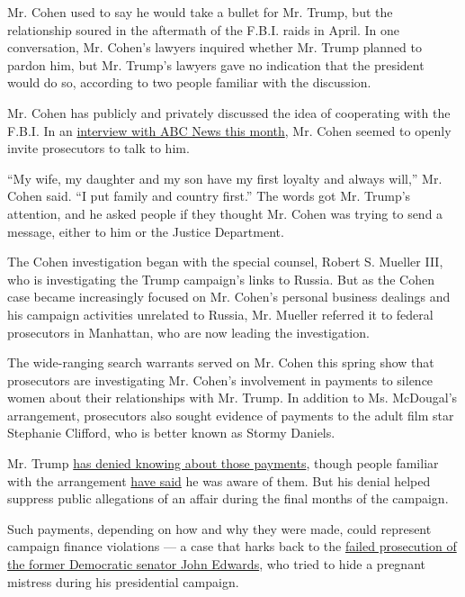 Mr. Cohen used to say he would take a bullet for Mr. Trump, but the
relationship soured in the aftermath of the F.B.I. raids in April. In
one conversation, Mr. Cohen's lawyers inquired whether Mr. Trump planned
to pardon him, but Mr. Trump's lawyers gave no indication that the
president would do so, according to two people familiar with the
discussion.

Mr. Cohen has publicly and privately discussed the idea of cooperating
with the F.B.I. In an
\href{https://abcnews.go.com/Politics/michael-cohen-family-country-president-trump-loyalty/story?id=56304585}{interview
with ABC News this month}, Mr. Cohen seemed to openly invite prosecutors
to talk to him.

``My wife, my daughter and my son have my first loyalty and always
will,'' Mr. Cohen said. ``I put family and country first.'' The words
got Mr. Trump's attention, and he asked people if they thought Mr. Cohen
was trying to send a message, either to him or the Justice Department.

The Cohen investigation began with the special counsel, Robert S.
Mueller III, who is investigating the Trump campaign's links to Russia.
But as the Cohen case became increasingly focused on Mr. Cohen's
personal business dealings and his campaign activities unrelated to
Russia, Mr. Mueller referred it to federal prosecutors in Manhattan, who
are now leading the investigation.

The wide-ranging search warrants served on Mr. Cohen this spring show
that prosecutors are investigating Mr. Cohen's involvement in payments
to silence women about their relationships with Mr. Trump. In addition
to Ms. McDougal's arrangement, prosecutors also sought evidence of
payments to the adult film star Stephanie Clifford, who is better known
as Stormy Daniels.

Mr. Trump
\href{https://www.nytimes3xbfgragh.onion/2018/05/04/us/politics/trump-hush-payment-stormy-daniels.html}{has
denied knowing about those payments}, though people familiar with the
arrangement
\href{https://www.nytimes3xbfgragh.onion/2018/05/04/us/politics/trump-hush-payment-stormy-daniels.html}{have
said} he was aware of them. But his denial helped suppress public
allegations of an affair during the final months of the campaign.

Such payments, depending on how and why they were made, could represent
campaign finance violations --- a case that harks back to the
\href{https://www.nytimes3xbfgragh.onion/2012/06/01/us/edwards-jury-returns-not-guilty-verdict-on-one-count.html}{failed
prosecution of the former Democratic senator John Edwards}, who tried to
hide a pregnant mistress during his presidential campaign.

